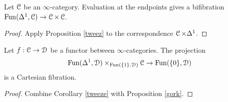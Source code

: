 \begin{corollary}\label{tweeze}
Let $\operatorname{\mathcal{C}}$ be an $\infty$-category. Evaluation at the endpoints gives a bifibration
$\operatorname{Fun}(\Delta^1,\operatorname{\mathcal{C}}) \rightarrow \operatorname{\mathcal{C}} \times \operatorname{\mathcal{C}}$.
\end{corollary}

\begin{proof}
Apply Proposition \ref{tweez} to the correspondence $\operatorname{\mathcal{C}} \times \Delta^1$.
\end{proof}

\begin{corollary}\label{tweezegork}
Let $f: \operatorname{\mathcal{C}} \rightarrow \operatorname{\mathcal{D}}$ be a functor between $\infty$-categories. The projection
$$ \operatorname{Fun}(\Delta^1, \operatorname{\mathcal{D}}) \times_{\operatorname{Fun}( \{1\}, \operatorname{\mathcal{D}}) } \operatorname{\mathcal{C}} \rightarrow \operatorname{Fun}(\{0\}, \operatorname{\mathcal{D}})$$
is a Cartesian fibration.
\end{corollary}

\begin{proof}
Combine Corollary \ref{tweeze} with Proposition \ref{gork}.
\end{proof}
